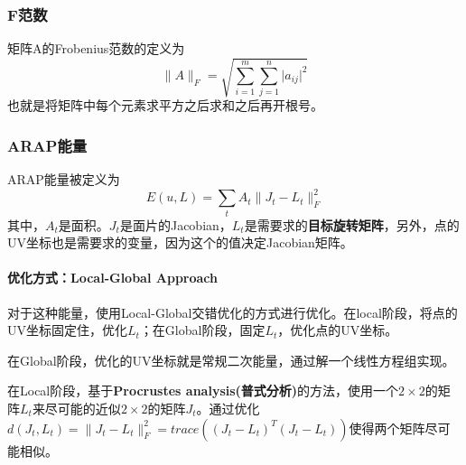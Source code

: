 \documentclass[a4paper]{D:/repositories/MyDGP/latex/PaperReadingLog}
\begin{document}
\subsubsection{F范数}
矩阵$\mathrm{A}$的Frobenius范数的定义为
$$
\lVert A \lVert_F=\sqrt{\sum_{i=1}^m\sum_{j=1}^n\lvert a_{ij}\lvert^2}
$$
也就是将矩阵中每个元素求平方之后求和之后再开根号。

\subsubsection{ARAP能量}
ARAP能量被定义为
$$
E(u,L)=\sum_tA_t\lVert J_t-L_t \lVert_F^2
$$
其中，$A_t$是面积。$J_t$是面片的Jacobian，$L_t$是需要求的\textbf{目标旋转矩阵}，另外，点的UV坐标也是需要求的变量，因为这个的值决定Jacobian矩阵。
\paragraph{优化方式：Local-Global Approach}
对于这种能量，使用Local-Global交错优化的方式进行优化。在local阶段，将点的UV坐标固定住，优化$L_t$；在Global阶段，固定$L_t$，优化点的UV坐标。

在Global阶段，优化的UV坐标就是常规二次能量，通过解一个线性方程组实现。

在Local阶段，基于\textbf{Procrustes analysis(普式分析)}的方法，使用一个$2\times 2$的矩阵$L_t$来尽可能的近似$2\times 2$的矩阵$J_t$。通过优化$d(J_t,L_t)=\lVert J_t-L_t \lVert_F^2=trace((J_t-L_t)^T(J_t-L_t))$使得两个矩阵尽可能相似。



\end{document}
